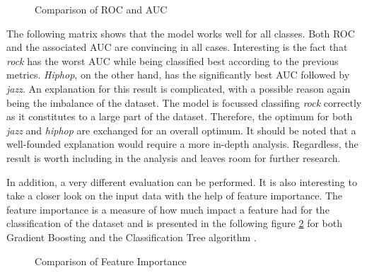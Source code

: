 
  \begin{figure}[H]
    \centering
    \qquad
    \caption{Comparison of ROC and AUC}%
    \label{fig:roc_and_auc_for_gb_and_dt}%
\end{figure}

The following matrix shows that the model works well for all classes. Both \ac{ROC} and the associated \ac{AUC} are convincing 
in all cases. Interesting is the fact that \emph{rock} has the worst \ac{AUC} while being classified best according to the previous metrics.
\emph{Hiphop}, on the other hand, has the significantly best \ac{AUC} followed by \emph{jazz}. An explanation for this result is complicated, with a 
possible reason again being the imbalance of the dataset. The model is focussed classifing \emph{rock} correctly as it constitutes to a large part of the 
dataset. Therefore, the optimum for both \emph{jazz} and \emph{hiphop} are exchanged for an overall optimum. It should be noted that a well-founded explanation
would require a more in-depth analysis. Regardless, the result is worth including in the analysis and leaves room for 
further research.   

In addition, a very different evaluation can be performed. It is also interesting to take a closer look on the input data with the help of 
feature importance. The feature importance is a measure of how much impact a feature had for the classification of the 
dataset and is presented in the following figure \ref{fig:feature_inportance_for_gb_and_dt} for both Gradient Boosting and the Classification Tree algorithm
\cite{scikit-learn_feature_importance}. 

\begin{figure}[H]
  \centering
  \qquad
  \caption{Comparison of Feature Importance}%
  \label{fig:feature_inportance_for_gb_and_dt}%
\end{figure}

